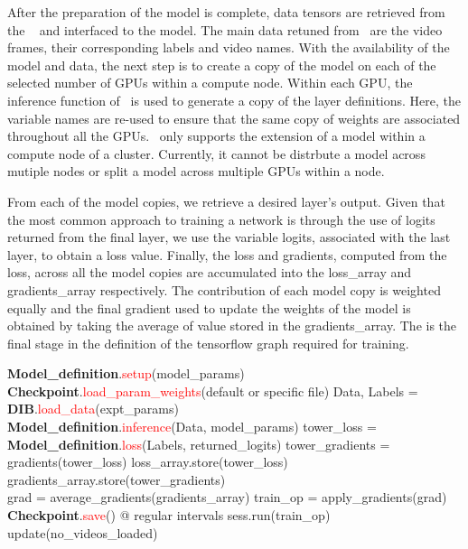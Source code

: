 \documentclass{llncs}
\begin{document}
After the preparation of the model is complete, data tensors are retrieved from the \data~ and interfaced to the model.
The main data retuned from \data~are the video frames, their corresponding labels and video names.
With the availability of the model and data, the next step is to create a copy of the model on each of the selected number of GPUs within a compute node.
Within each GPU, the inference function of \model~is used to generate a copy of the layer definitions. 
Here, the variable names are re-used to ensure that the same copy of weights are associated throughout all the GPUs.
\acro~only supports the extension of a model within a compute node of a cluster. 
Currently, it cannot be distrbute a model across mutiple nodes or split a model across multiple GPUs within a node.

From each of the model copies, we retrieve a desired layer's output. 
Given that the most common approach to training a network is through the use of logits returned from the final layer, we use the variable logits, associated with the last layer, to obtain a loss value.
Finally, the loss and gradients, computed from the loss, across all the model copies are accumulated into the loss\_array and gradients\_array respectively.
The contribution of each model copy is weighted equally and the final gradient used to update the weights of the model is obtained by taking the average of value stored in the gradients\_array.
The is the final stage in the definition of the tensorflow graph required for training.

\begin{algorithmic}[H]
\State \textbf{Model\_definition}.\textcolor{red}{setup}(model\_params)
\State \textbf{Checkpoint}.\textcolor{red}{load\_param\_weights}(default or specific file)
\State Data, Labels = \textbf{DIB}.\textcolor{red}{load\_data}(expt\_params)
\\
\State \textbf{Model\_definition}.\textcolor{red}{inference}(Data, model\_params)
\State tower\_loss = \textbf{Model\_definition}.\textcolor{red}{loss}(Labels, returned\_logits)
\State tower\_gradients = gradients(tower\_loss)
\State loss\_array.store(tower\_loss)
\State gradients\_array.store(tower\_gradients)
\EndFor
\\
\State grad = average\_gradients(gradients\_array)
\State train\_op = apply\_gradients(grad)
\\
\State \textbf{Checkpoint}.\textcolor{red}{save}() @ regular intervals
\State sess.run(train\_op)
\State update(no\_videos\_loaded)
\EndWhile
\EndProcedure
\end{algorithmic}
\end{document}
